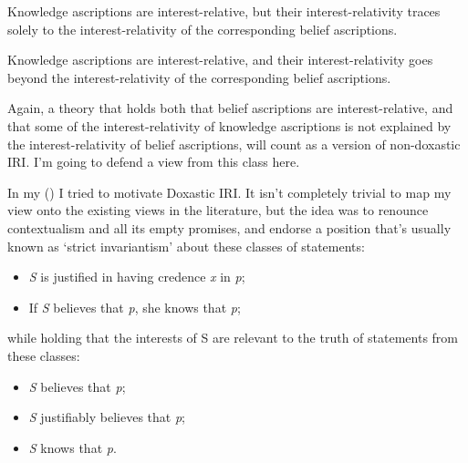 \documentclass[
  11pt,
  letterpaper,
  DIV=11,
  numbers=noendperiod,
  twoside]{scrartcl}
\providecommand{\tightlist}{%
  \setlength{\itemsep}{0pt}\setlength{\parskip}{0pt}}
\begin{document}
\begin{description}
\tightlist
\item[Doxastic IRI]
Knowledge ascriptions are interest-relative, but their
interest-relativity traces solely to the interest-relativity of the
corresponding belief ascriptions.
\item[Non-Doxastic IRI]
Knowledge ascriptions are interest-relative, and their
interest-relativity goes beyond the interest-relativity of the
corresponding belief ascriptions.
\end{description}

Again, a theory that holds both that belief ascriptions are
interest-relative, and that some of the interest-relativity of knowledge
ascriptions is not explained by the interest-relativity of belief
ascriptions, will count as a version of non-doxastic IRI. I'm going to
defend a view from this class here.

In my () I tried to motivate
Doxastic IRI. It isn't completely trivial to map my view onto the
existing views in the literature, but the idea was to renounce
contextualism and all its empty promises, and endorse a position that's
usually known as `strict invariantism' about these classes of
statements:

\begin{itemize}
\tightlist
\item
  \emph{S} is justified in having credence \emph{x} in \emph{p};
\item
  If \emph{S} believes that \emph{p}, she knows that \emph{p};
\end{itemize}

while holding that the interests of S are relevant to the truth of
statements from these classes:

\begin{itemize}
\tightlist
\item
  \emph{S} believes that \emph{p};
\item
  \emph{S} justifiably believes that \emph{p};
\item
  \emph{S} knows that \emph{p}.
\end{itemize}
\end{document}
